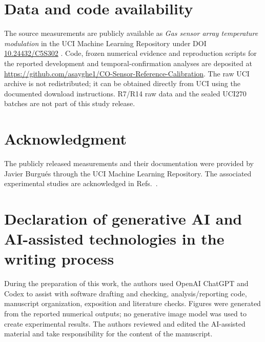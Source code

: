 \documentclass[11pt]{article}
\begin{document}
\section*{Data and code availability}
The source measurements are publicly available as \emph{Gas sensor array temperature modulation} in the UCI Machine Learning Repository under DOI \href{https://doi.org/10.24432/C5S302}{10.24432/C5S302} \cite{uci487}. Code, frozen numerical evidence and reproduction scripts for the reported development and temporal-confirmation analyses are deposited at \url{https://github.com/asayghe1/CO-Sensor-Reference-Calibration}. The raw UCI archive is not redistributed; it can be obtained directly from UCI using the documented download instructions. R7/R14 raw data and the sealed UCI270 batches are not part of this study release.



\section*{Acknowledgment}
The publicly released measurements and their documentation were provided by Javier Burgu\'es through the UCI Machine Learning Repository. The associated experimental studies are acknowledged in Refs.~\cite{burgues2018linear,burgues2018opls}.

\section*{Declaration of generative AI and AI-assisted technologies in the writing process}
During the preparation of this work, the authors used OpenAI ChatGPT and Codex to assist with software drafting and checking, analysis/reporting code, manuscript organization, exposition and literature checks. Figures were generated from the reported numerical outputs; no generative image model was used to create experimental results. The authors reviewed and edited the AI-assisted material and take responsibility for the content of the manuscript.



\end{document}
